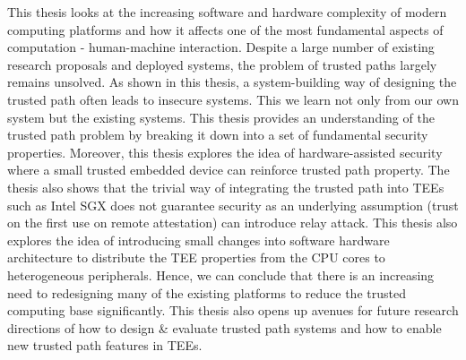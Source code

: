 This thesis looks at the increasing software and hardware complexity of modern computing platforms and how it affects one of the most fundamental aspects of computation - human-machine interaction. Despite a large number of existing research proposals and deployed systems, the problem of trusted paths largely remains unsolved. As shown in this thesis, a system-building way of designing the trusted path often leads to insecure systems. This we learn not only from our own system but the existing systems. This thesis provides an understanding of the trusted path problem by breaking it down into a set of fundamental security properties.
Moreover, this thesis explores the idea of hardware-assisted security where a small trusted embedded device can reinforce trusted path property. The thesis also shows that the trivial way of integrating the trusted path into TEEs such as Intel SGX does not guarantee security as an underlying assumption (trust on the first use on remote attestation) can introduce relay attack. This thesis also explores the idea of introducing small changes into software hardware architecture to distribute the TEE properties from the CPU cores to heterogeneous peripherals. Hence, we can conclude that there is an increasing need to redesigning many of the existing platforms to reduce the trusted computing base significantly. This thesis also opens up avenues for future research directions of how to design \& evaluate trusted path systems and how to enable new trusted path features in TEEs.

